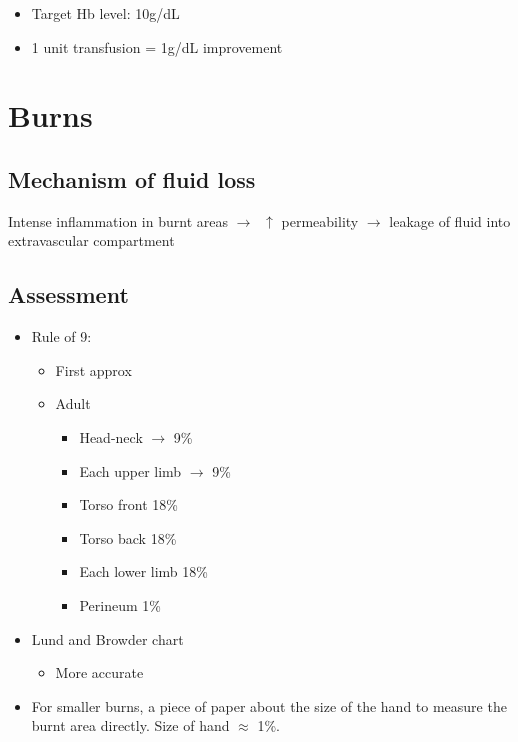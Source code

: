 \documentclass[
  14pt,
]{memoir}
\providecommand{\tightlist}{%
  \setlength{\itemsep}{0pt}\setlength{\parskip}{0pt}}
\begin{document}
\begin{itemize}
\tightlist
\item
  Target Hb level: 10g/dL
\item
  1 unit transfusion = 1g/dL improvement
\end{itemize}

\pagebreak

\hypertarget{burns}{%
\chapter{Burns}\label{burns}}

\hypertarget{mechanism-of-fluid-loss}{%
\section{Mechanism of fluid loss}\label{mechanism-of-fluid-loss}}

Intense inflammation in burnt areas \(\rightarrow\;\;\uparrow\)
permeability \(\rightarrow\) leakage of fluid into extravascular
compartment

\hypertarget{assessment}{%
\section{Assessment}\label{assessment}}

\begin{itemize}
\tightlist
\item
  Rule of 9:

  \begin{itemize}
  \tightlist
  \item
    First approx
  \item
    Adult

    \begin{itemize}
    \tightlist
    \item
      Head-neck \(\rightarrow\) 9\%
    \item
      Each upper limb \(\rightarrow\) 9\%
    \item
      Torso front 18\%
    \item
      Torso back 18\%
    \item
      Each lower limb 18\%
    \item
      Perineum 1\%
    \end{itemize}
  \end{itemize}
\item
  Lund and Browder chart

  \begin{itemize}
  \tightlist
  \item
    More accurate
  \end{itemize}
\item
  For smaller burns, a piece of paper about the size of the hand to
  measure the burnt area directly. Size of hand \(\approx\) 1\%.
\end{itemize}
\end{document}

